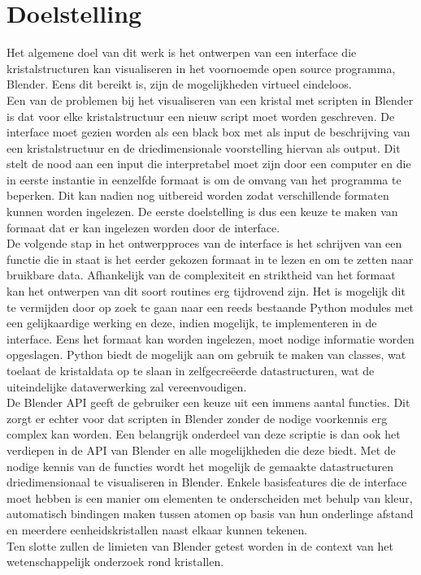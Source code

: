\section{Doelstelling}
Het algemene doel van dit werk is het ontwerpen van een interface die kristalstructuren kan visualiseren in het voornoemde open source programma, Blender. Eens dit bereikt is, zijn de mogelijkheden virtueel eindeloos. 
\\
Een van de problemen bij het visualiseren van een kristal met scripten in Blender is dat voor elke kristalstructuur een nieuw script moet worden geschreven. De interface moet gezien worden als een black box met als input de beschrijving van een kristalstructuur en de driedimensionale voorstelling hiervan als output. Dit stelt de nood aan een input die interpretabel moet zijn door een computer en die in eerste instantie in eenzelfde formaat is om de omvang van het programma te beperken. Dit kan nadien nog uitbereid worden zodat verschillende formaten kunnen worden ingelezen. De eerste doelstelling is dus een keuze te maken van formaat dat er kan ingelezen worden door de interface.  
\\
De volgende stap in het ontwerpproces van de interface is het schrijven van een functie die in staat is het eerder gekozen formaat in te lezen en om te zetten naar bruikbare data. Afhankelijk van de complexiteit en striktheid van het formaat kan het ontwerpen van dit soort routines erg tijdrovend zijn. Het is mogelijk dit te vermijden door op zoek te gaan naar een reeds bestaande Python modules met een gelijkaardige werking en deze, indien mogelijk, te implementeren in de interface. Eens het formaat kan worden ingelezen, moet nodige informatie worden opgeslagen. Python biedt de mogelijk aan om gebruik te maken van classes, wat toelaat de kristaldata op te slaan in zelfgecreëerde datastructuren, wat de uiteindelijke dataverwerking zal vereenvoudigen. 
\\
De Blender API geeft de gebruiker een keuze uit een immens aantal functies. Dit zorgt er echter voor dat scripten in Blender zonder de nodige voorkennis erg complex kan worden. Een belangrijk onderdeel van deze scriptie is dan ook het verdiepen in de API van Blender en alle mogelijkheden die deze biedt. Met de nodige kennis van de functies wordt het mogelijk de gemaakte datastructuren driedimensionaal te visualiseren in Blender. Enkele basisfeatures die de interface moet hebben is een manier om elementen te onderscheiden met behulp van kleur, automatisch bindingen maken tussen atomen op basis van hun onderlinge afstand en meerdere eenheidskristallen naast elkaar kunnen tekenen.
\\
Ten slotte zullen de limieten van Blender getest worden in de context van het wetenschappelijk onderzoek rond kristallen.  



